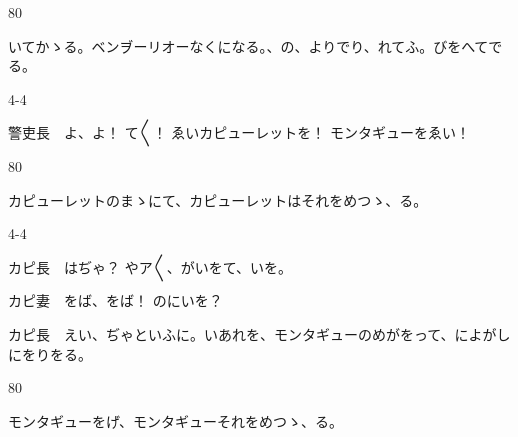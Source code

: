 \documentclass[tate,paper=b6j,jafontsize=9pt]{jlreq}
\begin{document}
\begin{azconvIndented}{8\zw}{0\zw}

いてかゝる。ベンヺーリオーなくになる。、の、よりでり、れてふ。びをへてでる。

\end{azconvIndented}
\begin{azconvIndented}{4\zw}{-4\zw}

警吏長　よ、よ！ て{〳〵}！ ゑいカピューレットを！ モンタギューをゑい！

\end{azconvIndented}
\begin{azconvIndented}{8\zw}{0\zw}

カピューレットのまゝにて、カピューレットはそれをめつゝ、る。

\end{azconvIndented}
\begin{azconvIndented}{4\zw}{-4\zw}

カピ長　はぢゃ？ やア{〳〵}、がいをて、いを。

カピ妻　をば、をば！ のにいを？

カピ長　えい、ぢゃといふに。いあれを、モンタギューのめがをって、によがしにをりをる。

\end{azconvIndented}
\begin{azconvIndented}{8\zw}{0\zw}

モンタギューをげ、モンタギューそれをめつゝ、る。

\end{azconvIndented}
\end{document}

